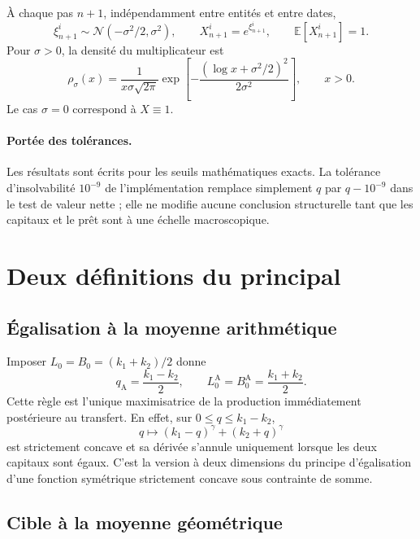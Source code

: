 \documentclass[11pt,a4paper]{article}
\newcommand{\E}{\mathbb E}
\newcommand{\1}{\mathbf 1}
\theoremstyle{definition}
\theoremstyle{remark}
\begin{document}
À chaque pas $n+1$, indépendamment entre entités et entre dates,
\begin{equation}
\xi^i_{n+1}\sim\mathcal N(-\sigma^2/2,\sigma^2),\qquad
X^i_{n+1}=e^{\xi^i_{n+1}},\qquad \E[X^i_{n+1}]=1.
\label{eq:shock}
\end{equation}
Pour $\sigma>0$, la densité du multiplicateur est
\begin{equation}
\rho_\sigma(x)=\frac{1}{x\sigma\sqrt{2\pi}}
\exp\!\left[-\frac{(\log x+\sigma^2/2)^2}{2\sigma^2}\right],
\qquad x>0.
\label{eq:lognormal-density}
\end{equation}
Le cas $\sigma=0$ correspond à $X\equiv1$.

\paragraph{Portée des tolérances.}
Les résultats sont écrits pour les seuils mathématiques exacts. La
tolérance d'insolvabilité $10^{-9}$ de l'implémentation remplace simplement
$q$ par $q-10^{-9}$ dans le test de valeur nette ; elle ne modifie aucune
conclusion structurelle tant que les capitaux et le prêt sont à une
échelle macroscopique.

\section{Deux définitions du principal}

\subsection{Égalisation à la moyenne arithmétique}

Imposer $L_0=B_0=(k_1+k_2)/2$ donne
\begin{equation}
q_{\mathrm A}=\frac{k_1-k_2}{2},
\qquad L_0^{\mathrm A}=B_0^{\mathrm A}=\frac{k_1+k_2}{2}.
\label{eq:qA}
\end{equation}
Cette règle est l'unique maximisatrice de la production immédiatement
postérieure au transfert. En effet, sur $0\leq q\leq k_1-k_2$,
\[
q\longmapsto (k_1-q)^\gamma+(k_2+q)^\gamma
\]
est strictement concave et sa dérivée s'annule uniquement lorsque les deux
capitaux sont égaux. C'est la version à deux dimensions du principe
d'égalisation d'une fonction symétrique strictement concave sous contrainte
de somme.

\subsection{Cible à la moyenne géométrique}
\end{document}
